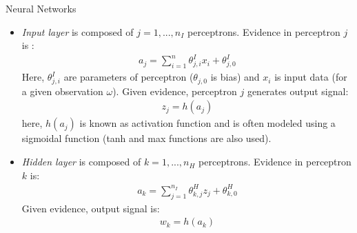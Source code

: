 \documentclass[9pt]{beamer}
\begin{document}
\begin{frame}{Neural Networks}

\begin{itemize}
\item {\em Input layer} is composed of $j=1,...,n_I$ perceptrons. Evidence in perceptron $j$ is :
\begin{align*}
a_j=\sum_{i=1}^n\theta_{j,i}^{I}x_i+\theta_{j,0}^I
\end{align*}
Here, $\theta_{j,i}^I$ are parameters of perceptron ($\theta_{j,0}$ is bias) and $x_i$ is input data (for a given observation $\omega$).  Given evidence, perceptron $j$ generates output signal:
\begin{align*}
z_j=h(a_j)
\end{align*}
here, $h(a_j)$ is known as activation function and is often modeled using a sigmoidal function (tanh and max functions are also used). 
\item {\em Hidden layer} is composed of $k=1,...,n_H$ perceptrons. Evidence in perceptron $k$ is:
\begin{align*}
a_k=\sum_{j=1}^{n_I}\theta_{k,j}^{H}z_j+\theta_{k,0}^H
\end{align*}
Given evidence, output signal is:
\begin{align*}
w_k=h(a_k)
\end{align*}

\end{itemize}

\end{frame}

\end{document}
